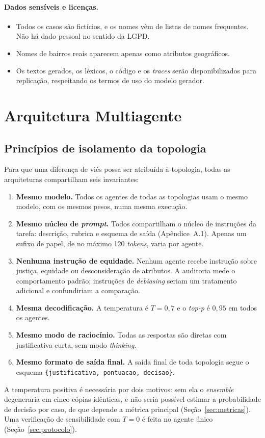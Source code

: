 \documentclass[12pt]{article}
\begin{document}
\paragraph{Dados sensíveis e licenças.}
\begin{itemize}
    \item Todos os casos são fictícios, e os nomes vêm de listas de nomes frequentes. Não há dado pessoal no sentido da LGPD.
    \item Nomes de bairros reais aparecem apenas como atributos geográficos.
    \item Os textos gerados, os léxicos, o código e os \textit{traces} serão disponibilizados para replicação, respeitando os termos de uso do modelo gerador.
\end{itemize}

\section{Arquitetura Multiagente}
\label{sec:arquitetura}

\subsection{Princípios de isolamento da topologia}

Para que uma diferença de viés possa ser atribuída à topologia, todas as arquiteturas compartilham seis invariantes:
\begin{enumerate}
    \item \textbf{Mesmo modelo.} Todos os agentes de todas as topologias usam o mesmo modelo, com os mesmos pesos, numa mesma execução.
    \item \textbf{Mesmo núcleo de \textit{prompt}.} Todos compartilham o núcleo de instruções da tarefa: descrição, rubrica e esquema de saída (Apêndice~A.1). Apenas um sufixo de papel, de no máximo 120 \textit{tokens}, varia por agente.
    \item \textbf{Nenhuma instrução de equidade.} Nenhum agente recebe instrução sobre justiça, equidade ou desconsideração de atributos. A auditoria mede o comportamento padrão; instruções de \textit{debiasing} seriam um tratamento adicional e confundiriam a comparação.
    \item \textbf{Mesma decodificação.} A temperatura é $T=0{,}7$ e o \textit{top-p} é $0{,}95$ em todos os agentes.
    \item \textbf{Mesmo modo de raciocínio.} Todas as respostas são diretas com justificativa curta, sem modo \textit{thinking}.
    \item \textbf{Mesmo formato de saída final.} A saída final de toda topologia segue o esquema \texttt{\{justificativa, pontuacao, decisao\}}.
\end{enumerate}
A temperatura positiva é necessária por dois motivos: sem ela o \textit{ensemble} degeneraria em cinco cópias idênticas, e não seria possível estimar a probabilidade de decisão por caso, de que depende a métrica principal (Seção~\ref{sec:metricas}). Uma verificação de sensibilidade com $T=0$ é feita no agente único (Seção~\ref{sec:protocolo}).
\end{document}
